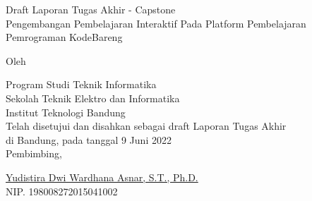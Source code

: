 \clearpage
\pagestyle{empty}

\begin{center}
    \smallskip

    \Large \bfseries \MakeUppercase{\thetitle}
    \vfill

    \Large Draft Laporan Tugas Akhir - Capstone \\
    Pengembangan Pembelajaran Interaktif Pada Platform Pembelajaran Pemrograman KodeBareng
    \vfill

    \large Oleh

    \Large \theauthor

    \large Program Studi Teknik Informatika \\

    \normalsize \normalfont
    Sekolah Teknik Elektro dan Informatika \\
    Institut Teknologi Bandung \\

    \vfill
    \normalsize \normalfont
    Telah disetujui dan disahkan sebagai draft Laporan Tugas Akhir \\
    di Bandung, pada tanggal 9 Juni 2022 \\

    \vspace{0.3cm}
    Pembimbing,

    \vspace{2cm}
    \underline{Yudistira Dwi Wardhana Asnar, S.T., Ph.D.} \\
    NIP. 198008272015041002

\end{center}
\clearpage
